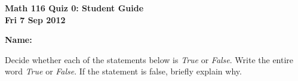 \documentclass[11pt,letterpaper]{article}
\begin{document}
\flushleft
\begin{multicols}{2}


\begin{large}\textbf{Math 116 Quiz 0: Student Guide \\
Fri 7 Sep 2012}\end{large}

\textbf{Name:  }\underline{\hspace{35ex}}

\vspace{.5in}

\end{multicols}

\pagestyle{empty}


\flushleft

Decide whether each of the statements below is \emph{True} or \emph{False}.  Write the entire word \emph{True} or \emph{False}.  If the statement is false, briefly explain why.  
\end{document}
